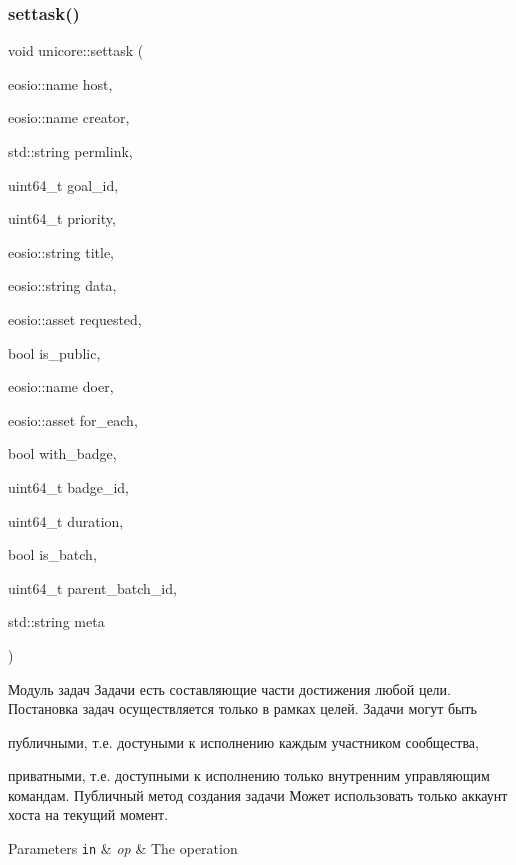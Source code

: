 \subsubsection{\texorpdfstring{settask()}{settask()}}
{\footnotesize\ttfamily void unicore\+::settask (\begin{DoxyParamCaption}\item[{eosio\+::name}]{host,  }\item[{eosio\+::name}]{creator,  }\item[{std\+::string}]{permlink,  }\item[{uint64\+\_\+t}]{goal\+\_\+id,  }\item[{uint64\+\_\+t}]{priority,  }\item[{eosio\+::string}]{title,  }\item[{eosio\+::string}]{data,  }\item[{eosio\+::asset}]{requested,  }\item[{bool}]{is\+\_\+public,  }\item[{eosio\+::name}]{doer,  }\item[{eosio\+::asset}]{for\+\_\+each,  }\item[{bool}]{with\+\_\+badge,  }\item[{uint64\+\_\+t}]{badge\+\_\+id,  }\item[{uint64\+\_\+t}]{duration,  }\item[{bool}]{is\+\_\+batch,  }\item[{uint64\+\_\+t}]{parent\+\_\+batch\+\_\+id,  }\item[{std\+::string}]{meta }\end{DoxyParamCaption})}



Модуль задач Задачи есть составляющие части достижения любой цели. Постановка задач осуществляется только в рамках целей. Задачи могут быть 


\begin{DoxyItemize}
\item публичными, т.\+е. достуными к исполнению каждым участником сообщества,
\item приватными, т.\+е. доступными к исполнению только внутренним управляющим командам. Публичный метод создания задачи Может использовать только аккаунт хоста на текущий момент.
\end{DoxyItemize}


\begin{DoxyParams}[1]{Parameters}
\mbox{\tt in}  & {\em op} & The operation \\
\hline
\end{DoxyParams}
\mbox{\label{classunicore_af4454491cb629dc007eed9b6febdd161}} 
